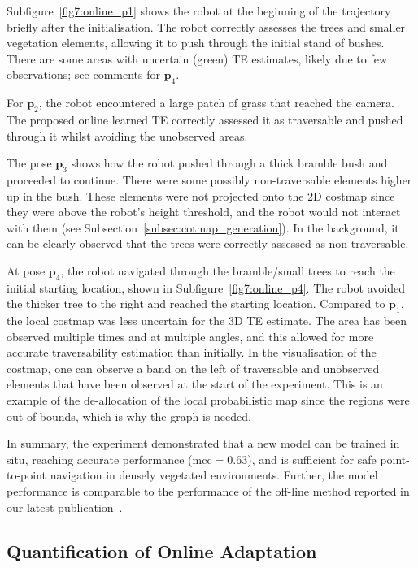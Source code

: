 Subfigure~\ref{fig7:online_p1} shows the robot at the beginning of the trajectory briefly after the initialisation. The robot correctly assesses the trees and smaller vegetation elements, allowing it to push through the initial stand of bushes. There are some areas with uncertain (green) TE estimates, likely due to few observations; see comments for $\mathbf{p}_4$.

For $\mathbf{p}_2$, the robot encountered a large patch of grass that reached the camera. The proposed online learned TE correctly assessed it as traversable and pushed through it whilst avoiding the unobserved areas.

The pose $\mathbf{p}_3$ shows how the robot pushed through a thick bramble bush and proceeded to continue. There were some possibly non-traversable elements higher up in the bush. These elements were not projected onto the 2D costmap since they were above the robot's height threshold, and the robot would not interact with them (see Subsection~\ref{subsec:cotmap_generation}). In the background, it can be clearly observed that the trees were correctly assessed as non-traversable.

 At pose $\mathbf{p}_4$, the robot navigated through the bramble/small trees to reach the initial starting location, shown in Subfigure~\ref{fig7:online_p4}. The robot avoided the thicker tree to the right and reached the starting location. Compared to $\mathbf{p}_1$, the local costmap was less uncertain for the 3D TE estimate. The area has been observed multiple times and at multiple angles, and this allowed for more accurate traversability estimation than initially. In the visualisation of the costmap, one can observe a band on the left of traversable and unobserved elements that have been observed at the start of the experiment. This is an example of the de-allocation of the local probabilistic map since the regions were out of bounds, which is why the graph is needed.

In summary, the experiment demonstrated that a new model can be trained in situ, reaching accurate performance (\ac{mcc}$=0.63$), and is sufficient for safe point-to-point navigation in densely vegetated environments. Further, the model performance is comparable to the performance of the off-line method reported in our latest publication~\cite{ruetz2024foresttrav}.



\subsection{Quantification of Online Adaptation}
\label{subsec:quant_online_adapt}

